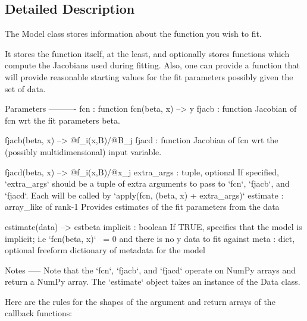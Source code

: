 \subsection{Detailed Description}
\begin{DoxyVerb}The Model class stores information about the function you wish to fit.

It stores the function itself, at the least, and optionally stores
functions which compute the Jacobians used during fitting. Also, one
can provide a function that will provide reasonable starting values
for the fit parameters possibly given the set of data.

Parameters
----------
fcn : function
      fcn(beta, x) --> y
fjacb : function
      Jacobian of fcn wrt the fit parameters beta.

      fjacb(beta, x) --> @f_i(x,B)/@B_j
fjacd : function
      Jacobian of fcn wrt the (possibly multidimensional) input
      variable.

      fjacd(beta, x) --> @f_i(x,B)/@x_j
extra_args : tuple, optional
      If specified, `extra_args` should be a tuple of extra
      arguments to pass to `fcn`, `fjacb`, and `fjacd`. Each will be called
      by `apply(fcn, (beta, x) + extra_args)`
estimate : array_like of rank-1
      Provides estimates of the fit parameters from the data

      estimate(data) --> estbeta
implicit : boolean
      If TRUE, specifies that the model
      is implicit; i.e `fcn(beta, x)` ~= 0 and there is no y data to fit
      against
meta : dict, optional
      freeform dictionary of metadata for the model

Notes
-----
Note that the `fcn`, `fjacb`, and `fjacd` operate on NumPy arrays and
return a NumPy array. The `estimate` object takes an instance of the
Data class.

Here are the rules for the shapes of the argument and return
arrays of the callback functions:


\end{DoxyVerb}
